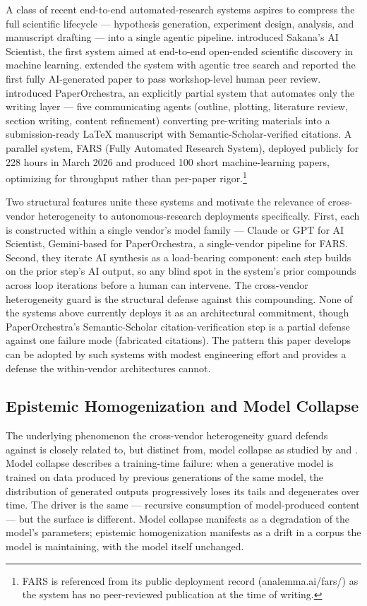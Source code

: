 A class of recent end-to-end automated-research systems aspires to compress the full scientific lifecycle --- hypothesis generation, experiment design, analysis, and manuscript drafting --- into a single agentic pipeline. \citet{lu2024ai} introduced Sakana's AI Scientist, the first system aimed at end-to-end open-ended scientific discovery in machine learning. \citet{yamada2025ai} extended the system with agentic tree search and reported the first fully AI-generated paper to pass workshop-level human peer review. \citet{song2026paperorchestra} introduced PaperOrchestra, an explicitly partial system that automates only the writing layer --- five communicating agents (outline, plotting, literature review, section writing, content refinement) converting pre-writing materials into a submission-ready LaTeX manuscript with Semantic-Scholar-verified citations. A parallel system, FARS (Fully Automated Research System), deployed publicly for 228 hours in March 2026 and produced 100 short machine-learning papers, optimizing for throughput rather than per-paper rigor.\footnote{FARS is referenced from its public deployment record (analemma.ai/fars/) as the system has no peer-reviewed publication at the time of writing.}

Two structural features unite these systems and motivate the relevance of cross-vendor heterogeneity to autonomous-research deployments specifically. First, each is constructed within a single vendor's model family --- Claude or GPT for AI Scientist, Gemini-based for PaperOrchestra, a single-vendor pipeline for FARS. Second, they iterate AI synthesis as a load-bearing component: each step builds on the prior step's AI output, so any blind spot in the system's prior compounds across loop iterations before a human can intervene. The cross-vendor heterogeneity guard is the structural defense against this compounding. None of the systems above currently deploys it as an architectural commitment, though PaperOrchestra's Semantic-Scholar citation-verification step is a partial defense against one failure mode (fabricated citations). The pattern this paper develops can be adopted by such systems with modest engineering effort and provides a defense the within-vendor architectures cannot.

\subsection{Epistemic Homogenization and Model Collapse}

The underlying phenomenon the cross-vendor heterogeneity guard defends against is closely related to, but distinct from, model collapse as studied by \citet{shumailov2024ai} and \citet{shumailov2023curse}. Model collapse describes a training-time failure: when a generative model is trained on data produced by previous generations of the same model, the distribution of generated outputs progressively loses its tails and degenerates over time. The driver is the same --- recursive consumption of model-produced content --- but the surface is different. Model collapse manifests as a degradation of the model's parameters; epistemic homogenization manifests as a drift in a corpus the model is maintaining, with the model itself unchanged.

